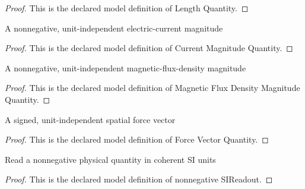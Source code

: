 \begin{proof}
  This is the declared model definition of Length Quantity.
\end{proof}
\begin{definition}
  \label{def:physics:phyx-mini-0950:phyxminiproblems-problemphyxmini0950-currentmagnitudequantity}
  A nonnegative, unit-independent electric-current magnitude
\end{definition}
\begin{proof}
  This is the declared model definition of Current Magnitude Quantity.
\end{proof}
\begin{definition}
  \label{def:physics:phyx-mini-0950:phyxminiproblems-problemphyxmini0950-magneticfluxdensitymagnitudequantity}
  A nonnegative, unit-independent magnetic-flux-density magnitude
\end{definition}
\begin{proof}
  This is the declared model definition of Magnetic Flux Density Magnitude Quantity.
\end{proof}
\begin{definition}
  \label{def:physics:phyx-mini-0950:phyxminiproblems-problemphyxmini0950-forcevectorquantity}
  A signed, unit-independent spatial force vector
\end{definition}
\begin{proof}
  This is the declared model definition of Force Vector Quantity.
\end{proof}
\begin{definition}
  \label{def:physics:phyx-mini-0950:phyxminiproblems-problemphyxmini0950-nonnegativesireadout}
  Read a nonnegative physical quantity in coherent SI units
\end{definition}
\begin{proof}
  This is the declared model definition of nonnegative SIReadout.
\end{proof}
